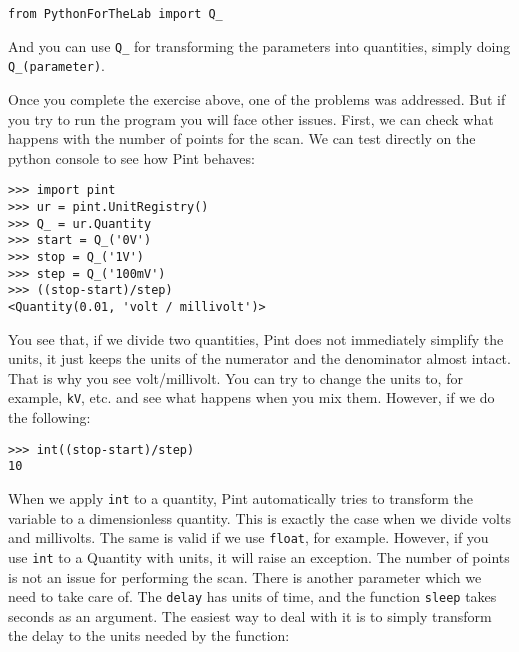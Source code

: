 \begin{verbatim}
from PythonForTheLab import Q_
\end{verbatim}

And you can use \texttt{Q_} for transforming the parameters into quantities, simply doing \texttt{Q_(parameter)}.




Once you complete the exercise above, one of the problems was addressed. But if you try to run the program you will face other issues. First, we can check what happens with the number of points for the scan. We can test directly on the python console to see how Pint behaves:

\begin{verbatim}
>>> import pint
>>> ur = pint.UnitRegistry()
>>> Q_ = ur.Quantity
>>> start = Q_('0V')
>>> stop = Q_('1V')
>>> step = Q_('100mV')
>>> ((stop-start)/step)
<Quantity(0.01, 'volt / millivolt')>
\end{verbatim}

You see that, if we divide two quantities, Pint does not immediately simplify the units, it just keeps the units of the numerator and the denominator almost intact. That is why you see volt/millivolt. You can try to change the units to, for example, \texttt{kV}, etc. and see what happens when you mix them. However, if we do the following:

\begin{verbatim}
>>> int((stop-start)/step)
10
\end{verbatim}

When we apply \texttt{int} to a quantity, Pint automatically tries to transform the variable to a dimensionless quantity. This is exactly the case when we divide volts and millivolts. The same is valid if we use \texttt{float}, for example. However, if you use \texttt{int} to a Quantity with units, it will raise an exception. The number of points is not an issue for performing the scan. There is another parameter which we need to take care of. The \texttt{delay} has units of time, and the function \texttt{sleep} takes seconds as an argument. The easiest way to deal with it is to simply transform the delay to the units needed by the function:

